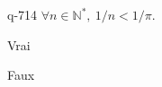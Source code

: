 \begin{truefalse}{q-714}
$\forall n \in \mathbb N^*,\: 1/n<1/\pi$.
\item Vrai
\item* Faux
\end{truefalse}

